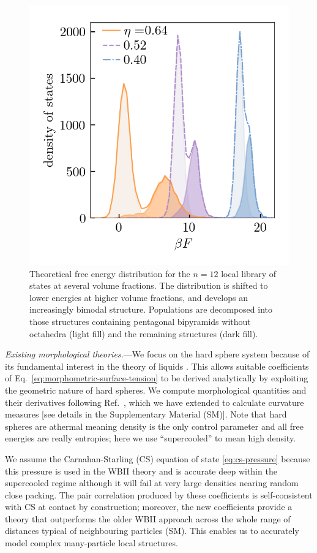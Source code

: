 \documentclass[11pt,twoside]{report}
\begin{document}
\begin{figure}
  \includegraphics[width=0.9\linewidth,outer]{n12-dos}
  \caption[Free energy distribution of 12 particle structures]{
    Theoretical free energy distribution for the $n=12$ local library of states at several volume fractions.
    The distribution is shifted to lower energies at higher volume fractions, and develops an increasingly bimodal structure.
    Populations are decomposed into those structures containing pentagonal bipyramids without octahedra (light fill) and the remaining structures (dark fill).
  }
  \label{fig:n12-dos}
\end{figure}

\emph{Existing morphological theories.}---We focus on the hard sphere system because of its fundamental interest in the theory of liquids \cite{WidomS1967,Hansen2013}.
This allows suitable coefficients of Eq.\ \eqref{eq:morphometric-surface-tension} to be derived analytically by exploiting the geometric nature of hard spheres.
We compute morphological quantities and their derivatives following Ref.\ \cite{KleninJCC2011}, which we have extended to calculate curvature measures [see details in the Supplementary Material (SM)].
Note that hard spheres are athermal meaning density is the only control parameter and all free energies are really entropies; here we use ``supercooled'' to mean high density.

We assume the Carnahan-Starling (CS) equation of state \eqref{eq:cs-pressure} \cite{CarnahanJCP1969} because this pressure is used in the WBII theory and is accurate deep within the supercooled regime \cite{BerthierPRL2016} although it will fail at very large densities nearing random close packing.
The pair correlation produced by these coefficients is self-consistent with CS at contact by construction; moreover, the new coefficients provide a theory that outperforms the older WBII approach across the whole range of distances typical of neighbouring particles (SM).
This enables us to accurately model complex many-particle local structures.
\end{document}
